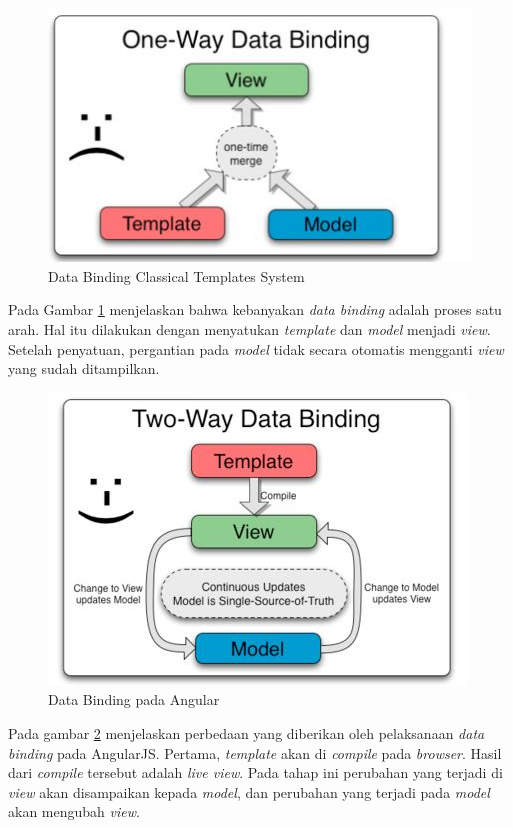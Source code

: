 	\begin{figure}[H]
		\centering
		\includegraphics[scale=0.75]{Gambar/Dabin1}
		\caption{Data Binding Classical Templates System}
		\label{fig:dabin1}
	\end{figure}
	Pada Gambar \ref{fig:dabin1} menjelaskan bahwa kebanyakan \textit{data binding} adalah proses satu arah. Hal itu dilakukan dengan menyatukan \textit{template} dan \textit{model} menjadi \textit{view}. Setelah penyatuan, pergantian pada \textit{model} tidak secara otomatis mengganti \textit{view} yang sudah ditampilkan.
	\begin{figure}[H]
		\centering
		\includegraphics[scale=0.75]{Gambar/Dabin2}
		\caption{Data Binding pada Angular}
		\label{fig:dabin2}
	\end{figure}
	Pada gambar \ref{fig:dabin2} menjelaskan perbedaan yang diberikan oleh pelaksanaan \textit{data binding} pada AngularJS. Pertama, \textit{template} akan di \textit{compile} pada \textit{browser}. Hasil dari \textit{compile} tersebut adalah \textit{live view}. Pada tahap ini perubahan yang terjadi di \textit{view} akan disampaikan kepada \textit{model}, dan perubahan yang terjadi pada \textit{model} akan mengubah \textit{view}.
	
